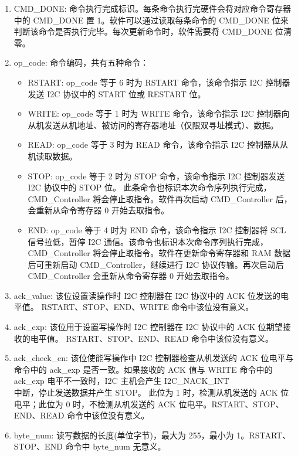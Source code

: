 \documentclass[main\_\_CN.tex]{subfiles}
\begin{document}
\begin{enumerate}

\item CMD\_DONE: 命令执行完成标识。每条命令执行完硬件会将对应命令寄存器中的 CMD\_DONE 置 1。软件可以通过读取每条命令的 CMD\_DONE 位来判断该命令是否执行完毕。每次更新命令时，软件需要将 CMD\_DONE 位清零。

\item op\_code: 命令编码，共有五种命令：

\begin{itemize}
    \item RSTART: op\_code 等于 6 时为 RSTART 命令，该命令指示 I2C 控制器发送 I2C 协议中的 START 位或 RESTART 位。

    \item WRITE: op\_code 等于 1 时为 WRITE 命令，该命令指示 I2C 控制器向从机发送从机地址、被访问的寄存器地址（仅限双寻址模式）、数据。

    \item READ: op\_code 等于 3 时为 READ 命令，该命令指示 I2C 控制器从从机读取数据。

    \item STOP: op\_code 等于 2 时为 STOP 命令，该命令指示 I2C 控制器发送 I2C 协议中的 STOP 位。 此条命令也标识本次命令序列执行完成，CMD\_Controller 将会停止取指令。软件再次启动 CMD\_Controller 后，会重新从命令寄存器 0 开始去取指令。

    \item END: op\_code 等于 4 时为 END 命令，该命令指示 I2C 控制器将 SCL 信号拉低，暂停 I2C 通信。该命令也标识本次命令序列执行完成，CMD\_Controller 将会停止取指令。软件在更新命令寄存器和 RAM 数据后可重新启动 CMD\_Controller，继续进行 I2C 协议传输。再次启动后 CMD\_Controller 会重新从命令寄存器 0 开始去取指令。

\end{itemize}

\item ack\_value: 该位设置读操作时 I2C 控制器在 I2C 协议中的 ACK 位发送的电平值。 RSTART、STOP、END、WRITE 命令中该位没有意义。

\item ack\_exp: 该位用于设置写操作时 I2C 控制器在 I2C 协议中的 ACK 位期望接收的电平值。 RSTART、STOP、END、READ 命令中该位没有意义。

\item ack\_check\_en: 该位使能写操作中 I2C 控制器检查从机发送的 ACK 位电平与命令中的 ack\_exp 是否一致。如果接收的 ACK 值与 WRITE 命令中的 ack\_exp 电平不一致时，I2C 主机会产生 I2C\_NACK\_INT\\ 中断，停止发送数据并产生 STOP。 此位为 1 时，检测从机发送的 ACK 位电平；此位为 0 时，不检测从机发送的 ACK 位电平。RSTART、STOP、END、READ 命令中该位没有意义。

\item byte\_num: 读写数据的长度(单位字节)，最大为 255，最小为 1。RSTART、STOP、END 命令中 byte\_num 无意义。

\end{enumerate}
\end{document}
